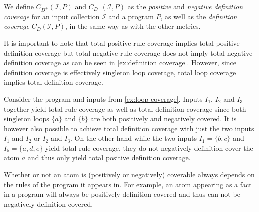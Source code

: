 We define \(C_{D^+}(\mathcal{I}, P)\) and \(C_{D^-}(\mathcal{I}, P)\) as the \emph{positive} and \emph{negative definition coverage} for an input collection $\mathcal{I}$ and a program $P$, as well as the \emph{definition coverage} \(C_D(\mathcal{I}, P)\), in the same way as with the other metrics.

It is important to note that total positive rule coverage implies total positive definition coverage but total negative rule coverage does not imply total negative definition coverage as can be seen in \cref{ex:definition coverage}. However, since definition coverage is effectively singleton loop coverage, total loop coverage implies total definition coverage.

\begin{example}
\label{ex:definition coverage}
    Consider the program and inputs from \cref{ex:loop coverage}. Inputs $I_1$, $I_2$ and $I_3$ together yield total rule coverage as well as total definition coverage since both singleton loops \(\{a\}\) and \(\{b\}\) are both positively and negatively covered. It is however also possible to achieve total definition coverage with just the two inputs $I_1$ and $I_2$ or $I_2$ and $I_3$. On the other hand while the two inputs \(I_1 = \{b, c\}\) and \(I_5 = \{a, d, e\}\) yield total rule coverage, they do not negatively definition cover the atom $a$ and thus only yield total positive definition coverage.
\end{example}

Whether or not an atom is (positively or negatively) coverable always depends on the rules of the program it appears in. For example, an atom appearing as a fact in a program will always be positively definition covered and thus can not be negatively definition covered.

\begin{comment}
    - 2 ways to introduce definition coverage:  \/
        
        - as a coverage metric for singleton loops (minimal loops) and therefore a special case of loop coverage        \/
    
        - as a representation of the disjunctions in the program (if an atom "a" is defined in multiple rules you could rewrite this as a if B1 v B2 v ...) -> this coverage metric covers these implicit disjunctions
    -> discuss both but in which order?     \/
    
    - Definition + example      \/
    
    (- this is different to rule coverage! -> total positive rule coverage implies total positive definition coverage, not the other way around and no connection for negative coverage!       \/
    
    - total loop coverage implies total definition coverage     \/
    
    - total program coverage implies total definition coverage)
\end{comment}

